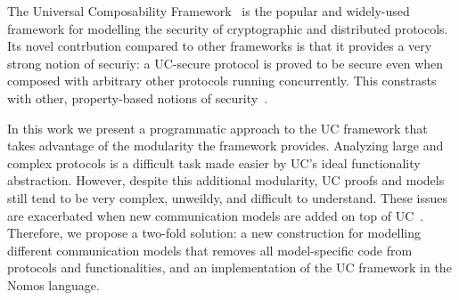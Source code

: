 The Universal Composability Framework~\cite{uc} is the popular and widely-used framework for modelling the security of cryptographic and distributed protocols.
Its novel contrbution compared to other frameworks is that it provides a very strong notion of securiy: a UC-secure protocol is proved to be secure even when composed with arbitrary other protocols running concurrently.
This constrasts with other, property-based notions of security~.

In this work we present a programmatic approach to the UC framework that takes advantage of the modularity the framework provides. 
Analyzing large and complex protocols is a difficult task made easier by UC's ideal functionality abstraction. 
However, despite this additional modularity, UC proofs and models still tend to be very complex, unweildy, and difficult to understand.
These issues are exacerbated when new communication models are added on top of UC~\cite{katz, etc}.
Therefore, we propose a two-fold solution: a new construction for modelling different communication models that removes all model-specific code from protocols and functionalities, and an implementation of the UC framework in the Nomos language. 


